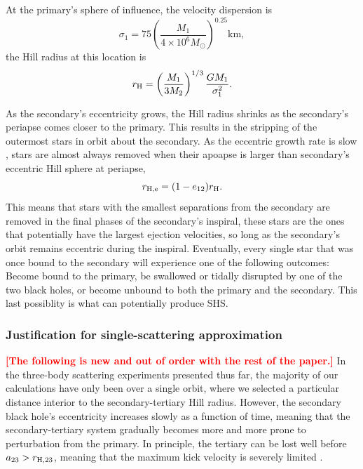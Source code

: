 \documentclass[a4paper,twocolumn]{emulateapj}
\newcommand{\colr}[1]{{\bf \textcolor{red}{[#1]}}}
\begin{document}
At the primary's sphere of influence, the velocity dispersion is
\begin{equation}
\sigma_{1} = 75 \left(\frac{M_{1}}{4 \times 10^{6} M_{\odot}}\right)^{0.25} \textrm{km}\label{eq:sigma},
\end{equation}
the Hill radius at this location is
\begin{equation}
r_{\rm H} = \left(\frac{M_{1}}{3 M_{2}}\right)^{1/3} \frac{G M_{1}}{\sigma_{1}^{2}}.
\end{equation}

As the secondary's eccentricity grows, the Hill radius shrinks as the secondary's periapse comes closer to the primary. This results in the stripping of the outermost stars in orbit about the secondary. As the eccentric growth rate is slow \citep[$\sim 10^{8}$ yr,][]{Iwasawa:2011a}, stars are almost always removed when their apoapse is larger than secondary's eccentric Hill sphere at periapse,
\begin{equation}
r_{\rm H,e} = (1 - e_{12}) r_{\rm H}.
\end{equation}
This means that stars with the smallest separations from the secondary are removed in the final phases of the secondary's inspiral, these stars are the ones that potentially have the largest ejection velocities, so long as the secondary's orbit remains eccentric during the inspiral. Eventually, every single star that was once bound to the secondary will experience one of the following outcomes: Become bound to the primary, be swallowed or tidally disrupted by one of the two black holes, or become unbound to both the primary and the secondary. This last possiblity is what can potentially produce SHS.

\subsubsection{Justification for single-scattering approximation}
\colr{The following is new and out of order with the rest of the paper.} In the three-body scattering experiments presented thus far, the majority of our calculations have only been over a single orbit, where we selected a particular distance interior to the secondary-tertiary Hill radius. However, the secondary black hole's eccentricity increases slowly as a function of time, meaning that the secondary-tertiary system gradually becomes more and more prone to perturbation from the primary. In principle, the tertiary can be lost well before $a_{23} > r_{{\rm H},23}$, meaning that the maximum kick velocity is severely limited \citep{Sari:2010a}.
\end{document}
